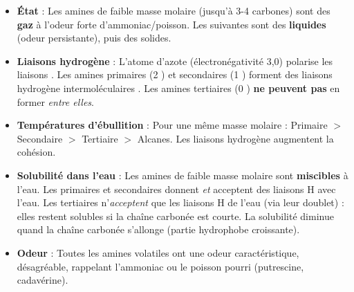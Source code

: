\documentclass[11pt]{article}
\newcommand{\cle}[1]{{\popxbold\color{popdark}#1}}
\begin{document}
\begin{propriete}
\begin{itemize}
\item \textbf{État} : Les amines de faible masse molaire (jusqu'à 3-4 carbones) sont des \textbf{gaz} à l'odeur forte d'ammoniac/poisson. Les suivantes sont des \textbf{liquides} (odeur persistante), puis des solides.
\item \textbf{Liaisons hydrogène} : L'atome d'azote (électronégativité 3,0) polarise les liaisons . Les amines primaires (2 ) et secondaires (1 ) forment des \cle{liaisons hydrogène intermoléculaires} . Les amines tertiaires (0 ) \textbf{ne peuvent pas} en former \emph{entre elles}.
\item \textbf{Températures d'ébullition} : Pour une même masse molaire : Primaire $>$ Secondaire $>$ Tertiaire $>$ Alcanes. Les liaisons hydrogène augmentent la cohésion.
\item \textbf{Solubilité dans l'eau} : Les amines de faible masse molaire sont \textbf{miscibles} à l'eau. Les primaires et secondaires donnent \emph{et} acceptent des liaisons H avec l'eau. Les tertiaires n'\emph{acceptent} que les liaisons H de l'eau (via leur doublet) : elles restent solubles si la chaîne carbonée est courte. La solubilité diminue quand la chaîne carbonée s'allonge (partie hydrophobe croissante).
\item \textbf{Odeur} : Toutes les amines volatiles ont une odeur caractéristique, désagréable, rappelant l'ammoniac ou le poisson pourri (putrescine, cadavérine).
\end{itemize}
\end{propriete}
\end{document}
